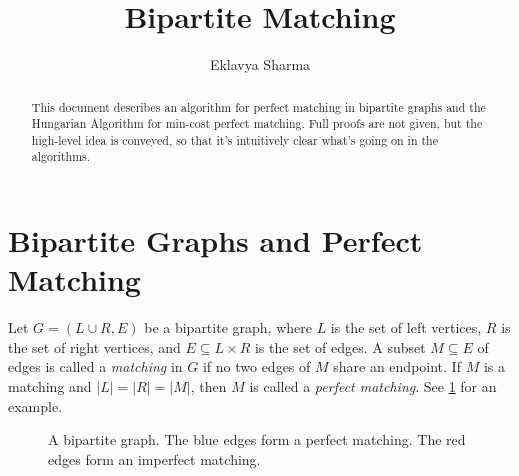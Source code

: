 \documentclass[a4paper,12pt,fleqn]{article}
\title{Bipartite Matching}
\author{Eklavya Sharma}
\date{\empty}
\begin{document}
\maketitle
\setlength{\parindent}{0pt}
\setlength{\parskip}{0.5em}

\begin{abstract}
This document describes an algorithm for perfect matching in bipartite graphs
and the Hungarian Algorithm for min-cost perfect matching.
Full proofs are not given, but the high-level idea is conveyed,
so that it's intuitively clear what's going on in the algorithms.
\end{abstract}

\section{Bipartite Graphs and Perfect Matching}

Let $G = (L \cup R, E)$ be a bipartite graph, where $L$ is the set of left vertices,
$R$ is the set of right vertices, and $E \subseteq L \times R$ is the set of edges.
A subset $M \subseteq E$ of edges is called a \emph{matching} in $G$
if no two edges of $M$ share an endpoint.
If $M$ is a matching and $|L| = |R| = |M|$, then $M$ is called a \emph{perfect matching}.
See \cref{fig:ex-pmatch} for an example.

\begin{figure}[htb]
\centering
{}
\caption{A bipartite graph. The blue edges form a perfect matching.
The red edges form an imperfect matching.}
\label{fig:ex-pmatch}
\end{figure}
\end{document}
